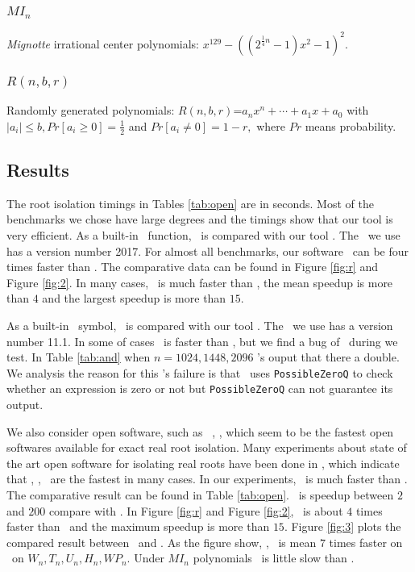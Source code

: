  \subsubsection{$MI_n$} {\it Mignotte} irrational center polynomials: $x^{129}-((2^{\frac{1}{4}n}-1)x^2-1)^2$.
 
 
 \subsubsection{$R(n,b,r) $} Randomly generated polynomials: $R(n,b,r)$=$a_nx^n+\cdots+a_1x+a_0$ with $|a_i|\le b, Pr[a_i\ge 0]=\frac{1}{2}$ and  $Pr[a_i\neq 0] =1-r,$ where $Pr$ means probability.
 \subsection{Results}
 The root isolation timings in Tables \ref{tab:open} are in seconds.  Most of the benchmarks we chose have large degrees and the timings show that our tool is very efficient.
 {\color{red} As a  built-in  \MAPLE\ function, \REALROOT\ is    compared with  our tool \froot. 
 	The   \MAPLE\  we use has a version number 2017.}  For  almost all
 benchmarks, our  software \froot\  can be  four  times faster than \REALROOT. The comparative data can be found in Figure \ref{fig:r} and Figure \ref{fig:2}. {\color{red} In many cases, \froot\ is much faster than \REALROOT, the mean speedup is more than $4$ and the largest speedup is more than $15$.}
 
 
 As a  built-in \MM\ symbol, \inte\ is    compared with  our tool \froot. The  \MM\  we use has a version number 11.1. {\color{red} In some of cases \inte\ is faster than \froot, but we find a bug of  \MM\  during we test. In Table  \ref{tab:and} when $n=1024,1448,2096$  \inte's ouput that there a double. We analysis the reason for this \inte's failure is that \inte\ uses {\tt PossibleZeroQ} to check whether an expression is zero or not but  {\tt PossibleZeroQ} can not guarantee its output.}
 
 
 We also consider open software,  such as \cf\  \cite{hemmer09}, \AND\cite{Tsigaridas2016}, \SLV\cite{kobel2016computing}  which
 seem to be the fastest  open softwares  available for exact real root isolation. Many experiments  about  state of the art open software for isolating
 real roots have been done in \cite{hemmer09,Tsigaridas2016,kobel2016computing},  which  indicate that     \cf, \AND, \SLV\ 
 are  the fastest in many cases.
 In our experiments, \froot\ is much faster than \cf. %
 The comparative result can be found in
 Table \ref{tab:open}. {\color{red}\froot\ is speedup between $2$ and $200$ compare with \cf.  In Figure \ref{fig:r} and Figure \ref{fig:2}, \froot\ is about $4$ times faster than \AND\ and the maximum speedup is more than $15$.  Figure \ref{fig:3} plots the  compared 
 	result between \froot\ and \SLV. As the figure show, \SLV, \froot\  is mean   $7$ times faster on  \SLV\ on $W_n,T_n,U_n,H_n,WP_n$. Under $MI_n$ polynomials \froot\ is little slow  than \SLV. }
 
